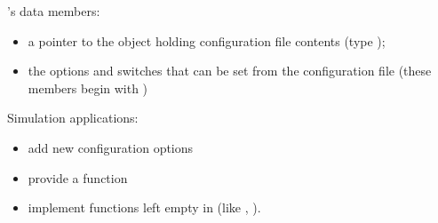's data members:
\begin{itemize}
  \item{a pointer to the object holding configuration file contents
    (type );}
  \item{the options and switches that can be set from the
    configuration file (these members begin with )}
\end{itemize}

Simulation applications:
\begin{itemize}
  \item{add new configuration options}
  \item{provide a  function}
  \sloppy
  \item{implement functions left empty in  (like
    , ).}
\end{itemize}


%
%
%

